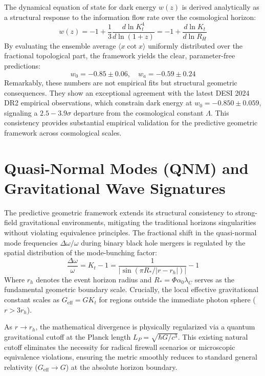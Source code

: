\documentclass[11pt,a4paper]{article}
\begin{document}
The dynamical equation of state for dark energy $w(z)$ is derived analytically as a structural response to the information flow rate over the cosmological horizon:
\begin{equation}
w(z) = -1 + \frac{1}{3} \frac{d \ln K_t^4}{d \ln(1+z)} = -1 + \frac{d \ln K_t}{d \ln R_H}
\end{equation}
By evaluating the ensemble average $\langle x \cot x \rangle$ uniformly distributed over the fractional topological part, the framework yields the clear, parameter-free predictions:
\begin{equation}
w_0 = -0.85 \pm 0.06, \quad w_a = -0.59 \pm 0.24
\end{equation}
Remarkably, these numbers are not empirical fits but structural geometric consequences. They show an exceptional agreement with the latest DESI 2024 DR2 empirical observations, which constrain dark energy at $w_0 = -0.850 \pm 0.059$, signaling a $2.5 - 3.9\sigma$ departure from the cosmological constant $\Lambda$. This consistency provides substantial empirical validation for the predictive geometric framework across cosmological scales.

\section{Quasi-Normal Modes (QNM) and Gravitational Wave Signatures}
The predictive geometric framework extends its structural consistency to strong-field gravitational environments, mitigating the traditional horizons singularities without violating equivalence principles. The fractional shift in the quasi-normal mode frequencies $\Delta\omega/\omega$ during binary black hole mergers is regulated by the spatial distribution of the mode-bunching factor:
\begin{equation}
\frac{\Delta\omega}{\omega} = K_t - 1 = \frac{1}{|\sin(\pi R_*/|r - r_h|)|} - 1
\end{equation}
Where $r_h$ denotes the event horizon radius and $R_* = \Phi \alpha_0 \lambda_C$ serves as the fundamental geometric boundary scale. Crucially, the local effective gravitational constant scales as $G_{\text{eff}} = G K_t$ for regions outside the immediate photon sphere ($r > 3r_h$). 

As $r \to r_h$, the mathematical divergence is physically regularized via a quantum gravitational cutoff at the Planck length $L_P = \sqrt{\hbar G/c^3}$. This existing natural cutoff eliminates the necessity for radical firewall scenarios or microscopic equivalence violations, ensuring the metric smoothly reduces to standard general relativity ($G_{\text{eff}} \to G$) at the absolute horizon boundary. 
\end{document}
